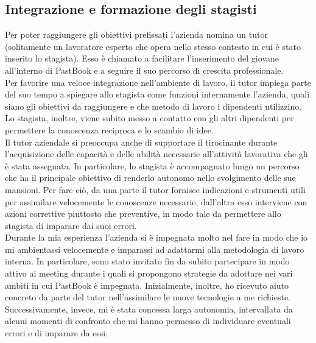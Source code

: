 		\subsection{Integrazione e formazione degli stagisti}
			Per poter raggiungere gli obiettivi prefissati l'azienda nomina un tutor (solitamente un lavoratore esperto che opera nello
			stesso contesto in cui è stato inserito lo stagista). Esso è chiamato a facilitare l'inserimento del giovane all'interno di
			PastBook e a seguire il suo percorso di crescita professionale.\\
			Per favorire una veloce integrazione nell'ambiente di lavoro, il tutor impiega parte del suo tempo a spiegare allo stagista
			come funzioni internamente l'azienda, quali siano gli obiettivi da raggiungere e che metodo di lavoro i dipendenti
			utilizzino. Lo stagista, inoltre, viene subito messo a contatto con gli altri dipendenti per permettere la conoscenza
			reciproca e lo scambio di idee.\\
			Il tutor aziendale si preoccupa anche di supportare il tirocinante durante l'acquisizione delle capacità e delle abilità
			necessarie all'attività lavorativa che gli è stata assegnata. In particolare, lo stagista è accompagnato lungo un percorso
			che ha il principale obiettivo di renderlo autonomo nello svolgimento delle sue mansioni. Per fare ciò, da una parte il tutor
			fornisce indicazioni e strumenti utili per assimilare velocemente le conoscenze necessarie, dall'altra esso interviene con
			azioni correttive piuttosto che preventive, in modo tale da permettere allo stagista di imparare dai suoi errori.\\
			Durante la mia esperienza l'azienda si è impegnata molto nel fare in modo che io mi ambientassi velocemente e imparassi ad
			adattarmi alla metodologia di lavoro interna. In particolare, sono stato invitato fin da subito	partecipare in modo attivo
			ai meeting durante i quali si propongono strategie da adottare nei vari ambiti in cui PastBook è impegnata. Inizialmente,
			inoltre, ho ricevuto aiuto concreto da parte del tutor nell'assimilare le nuove tecnologie a me richieste. Successivamente,
			invece, mi è stata concessa larga autonomia, intervallata da alcuni momenti di confronto che mi hanno permesso di individuare
			eventuali errori e di imparare da essi.
